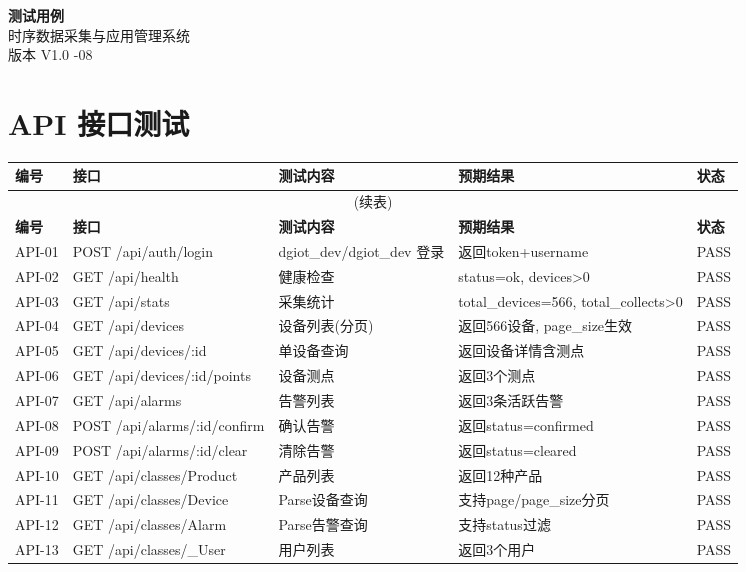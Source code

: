 \documentclass[11pt,a4paper]{ctexart}
\begin{document}
\begin{center}
{\Huge\bfseries 测试用例}\\[8pt]
{\large 时序数据采集与应用管理系统}\\[8pt]
{\large 版本 V1.0 -08}
\end{center}
\vspace{1em}\noindent\hrulefill\vspace{1em}

\section{API 接口测试}

\begin{longtable}{p{1.8cm} p{2.5cm} p{5.5cm} p{2.5cm} p{2cm}}
\toprule
\textbf{编号} & \textbf{接口} & \textbf{测试内容} & \textbf{预期结果} & \textbf{状态} \\
\midrule
\endfirsthead
\multicolumn{5}{c}{(续表)} \\
\toprule
\textbf{编号} & \textbf{接口} & \textbf{测试内容} & \textbf{预期结果} & \textbf{状态} \\
\midrule
\endhead
API-01 & POST /api/auth/login & dgiot\_dev/dgiot\_dev 登录 & 返回token+username & PASS \\
API-02 & GET /api/health & 健康检查 & status=ok, devices>0 & PASS \\
API-03 & GET /api/stats & 采集统计 & total\_devices=566, total\_collects>0 & PASS \\
API-04 & GET /api/devices & 设备列表(分页) & 返回566设备, page\_size生效 & PASS \\
API-05 & GET /api/devices/:id & 单设备查询 & 返回设备详情含测点 & PASS \\
API-06 & GET /api/devices/:id/points & 设备测点 & 返回3个测点 & PASS \\
API-07 & GET /api/alarms & 告警列表 & 返回3条活跃告警 & PASS \\
API-08 & POST /api/alarms/:id/confirm & 确认告警 & 返回status=confirmed & PASS \\
API-09 & POST /api/alarms/:id/clear & 清除告警 & 返回status=cleared & PASS \\
API-10 & GET /api/classes/Product & 产品列表 & 返回12种产品 & PASS \\
API-11 & GET /api/classes/Device & Parse设备查询 & 支持page/page\_size分页 & PASS \\
API-12 & GET /api/classes/Alarm & Parse告警查询 & 支持status过滤 & PASS \\
API-13 & GET /api/classes/\_User & 用户列表 & 返回3个用户 & PASS \\

\end{longtable}
\end{document}
